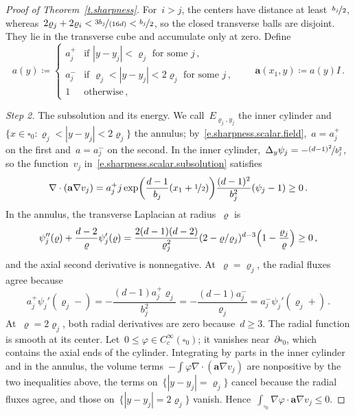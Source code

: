 \documentclass[11pt,letterpaper]{article}
\numberwithin{equation}{section}
\theoremstyle{definition}
\renewcommand{\a}{\mathbf{a}}
\newcommand{\nf}{\nicefrac}
\newcommand{\cu}{\square}
\begin{document}
\begin{proof}[Proof of Theorem~\ref{t.sharpness}]
\smallskip
For~$i>j$, the centers have distance at least~$\nf{b_j}2$, whereas~$2\varrho_j+2\varrho_i<\nf{3b_j}{(16d)}<\nf{b_j}2$, so the closed transverse balls are disjoint. They lie in the transverse cube and accumulate only at zero. Define
\begin{equation}
	a(y)\coloneqq\begin{cases}a_j^+&\mbox{if }|y-y_j|<\varrho_j\mbox{ for some }j\,,\\a_j^-&\mbox{if }\varrho_j<|y-y_j|<2\varrho_j\mbox{ for some }j\,,\\1&\mbox{otherwise}\,,\end{cases}\qquad\a(x_1,y)\coloneqq a(y)I\,.
	\label{e.sharpness.scalar.field}
\end{equation}

\smallskip
\emph{Step 2.} The subsolution and its energy. We call~$E_{\varrho_j,y_j}$ the inner cylinder and~$\{x\in\cu_0:\varrho_j<|y-y_j|<2\varrho_j\}$ the annulus; by~\eqref{e.sharpness.scalar.field},~$a=a_j^+$ on the first and~$a=a_j^-$ on the second. In the inner cylinder,~$\Delta_y\psi_j=-\nf{(d-1)^2}{b_j^2}$, so the function~$v_j$ in~\eqref{e.sharpness.scalar.subsolution} satisfies
\begin{equation*}
	\nabla\cdot(\a\nabla v_j)=a_j^+j\exp\biggl(\frac{d-1}{b_j}(x_1+\nf12)\biggr)\frac{(d-1)^2}{b_j^2}(\psi_j-1)\geq0\,.
\end{equation*}
In the annulus, the transverse Laplacian at radius~$\varrho$ is
\begin{equation*}
	\psi_j''(\varrho)+\frac{d-2}{\varrho}\psi_j'(\varrho)=\frac{2(d-1)(d-2)}{\varrho_j^2}(2-\varrho/\varrho_j)^{d-3}\Bigl(1-\frac{\varrho_j}{\varrho}\Bigr)\geq0\,,
\end{equation*}
and the axial second derivative is nonnegative. At~$\varrho=\varrho_j$, the radial fluxes agree because
\begin{equation*}
	a_j^+\psi_j'(\varrho_j-)=-\frac{(d-1)a_j^+\varrho_j}{b_j^2}=-\frac{(d-1)a_j^-}{\varrho_j}=a_j^-\psi_j'(\varrho_j+)\,.
\end{equation*}
At~$\varrho=2\varrho_j$, both radial derivatives are zero because~$d\geq3$. The radial function is smooth at its center. Let~$0\leq\varphi\in C^\infty_c(\cu_0)$; it vanishes near~$\partial\cu_0$, which contains the axial ends of the cylinder. Integrating by parts in the inner cylinder and in the annulus, the volume terms~$-\int\varphi\nabla\cdot(\a\nabla v_j)$ are nonpositive by the two inequalities above, the terms on~$\{|y-y_j|=\varrho_j\}$ cancel because the radial fluxes agree, and those on~$\{|y-y_j|=2\varrho_j\}$ vanish. Hence~$\int_{\cu_0}\nabla\varphi\cdot\a\nabla v_j\leq0$.


\end{proof}
\end{document}
